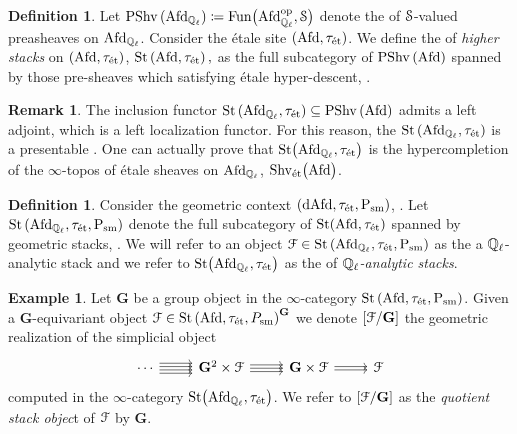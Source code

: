 \documentclass[10pt,a4paper]{amsart}
\numberwithin{equation}{subsection}
\theoremstyle{plain}
\theoremstyle{definition}
\newtheorem{defi}[theorem]{Definition}
\newtheorem{exem}[theorem]{Example}
\newtheorem{rema}[theorem]{Remark}
\theoremstyle{remark}
\numberwithin{equation}{section}
\begin{document}
\begin{defi} \label{const_1}
Let $\mathrm{PShv} \left( \mathrm{Afd}_{\mathbb{Q}_\ell}
\right) \coloneqq \mathrm{Fun} \big( \mathrm{Afd}_{\mathbb{Q}_\ell}^{\mathrm{op}}, \mathcal S \big)$ denote the \infcat of $\mathcal S$-valued preasheaves on $\mathrm{Afd}_{\mathbb{Q}_\ell}$.
Consider the \'etale site $( \mathrm{Afd}, \tau_{\text{\'et}})$. We define the \infcat of \emph{higher stacks} on $(\mathrm{Afd}, \tau_{\text{\'et}})$, $\mathrm{St} \left( \mathrm{Afd}, \tau_{\text{\'et}} \right),
$ as the full subcategory of $\mathrm{PShv} \left( \mathrm{Afd} \right)$ spanned by those pre-sheaves which satisfying \'etale hyper-descent, \cite[\S 7]{lurieHTT}.
\end{defi}

\begin{rema}
The inclusion functor $ \mathrm{St} \left( \mathrm{Afd}_{\mathbb{Q}_\ell}, \tau_{\text{\'et}} \right) \subseteq \mathrm{PShv} \left( \mathrm{Afd} \right)$ admits a left adjoint, which is a left localization functor.
For this reason, the \infcat $\mathrm{St} \left( \mathrm{Afd}_{\mathbb{Q}_\ell}, \tau_{\text{\'et}} \right)$ is a presentable \infcat. One can actually prove that $\mathrm{St} \big( \mathrm{Afd}_{\mathbb{Q}_\ell}, \tau_{\text{\'et}} \big)$
is the hypercompletion of the $\infty$-topos of \'etale sheaves on $\mathrm{Afd}_{\mathbb{Q}_\ell}$, $\mathrm{Shv}_{\text{\'et}} \big( \mathrm{Afd} \big)$.
\end{rema}

\begin{defi}
Consider the geometric context $(\mathrm{dAfd}, \tau_{\text{\'et}}, \mathrm P_{\mathrm{sm}} )$, \cite[Definition 2.3.1]{me1}. Let $\mathrm{St} \left( \mathrm{Afd}_{\mathbb{Q}_\ell}, \tau_{\text{\'et}}, \mathrm {\mathrm P}_{\mathrm{sm}} \right)$ denote the full subcategory of $\mathrm{St}( \mathrm{Afd}, \tau_{\text{\'et}})$
spanned by geometric stacks, \cite[Definition 2.3.2]{me1}. We will refer to an object $\mathcal{F} \in  \mathrm{St} \left( \mathrm{Afd}_{\mathbb{Q}_\ell}, \tau_{\text{\'et}}, \mathrm {\mathrm P}_{\mathrm{sm}} \right)$ as the
a $\mathbb{Q}_\ell$-analytic stack and we refer to $\mathrm{St} \big( \mathrm{Afd}_{\mathbb{Q}_\ell}, \tau_{\text{\'et}} \big)$ as the \infcat of \emph{$\mathbb{Q}_\ell$-analytic stacks}.
\end{defi}

\begin{exem}
Let $\mathbf G$ be a group object in the $\infty$-category $\mathrm{St} \left( \mathrm{Afd}, \tau_{\text{\'et}}, \mathrm P_{\mathrm{sm}} \right)$. Given a $\mathbf G$-equivariant object $\mathcal{F} \in \mathrm{St} \left( \mathrm{Afd}, \tau_{\text{\'et}}, P_{\mathrm{sm}} \right)^{\mathbf G}$ we denote $[\mathcal{F} / \mathbf G ]$ the geometric
realization of the simplicial object
	\[
	\begin{tikzcd}
 		\cdots \arrow[r, shift left=0.5] \arrow[r, shift right=1.5]
		\arrow[r, shift left=1.5]
		\arrow[r, shift right=0.5]
		& \mathbf G^2 \times \cF \arrow[r, shift left] \arrow[r]
		\arrow[r, shift right]
		& \mathbf G \times \cF  \arrow[r, shift left=0.5] \arrow[r, shift right=0.5]
		& \cF	\end{tikzcd}
	\]
computed in the $\infty$-category $\mathrm{St} \big( \mathrm{Afd}_{\mathbb{Q}_\ell}, \tau_{\text{\'et}} \big)$. We refer to $[\mathcal{F} / \mathbf G ]$ as the \emph{quotient stack objec}t of $\mathcal{F}$ by $\mathbf G$. 
\end{exem}
\end{document}
